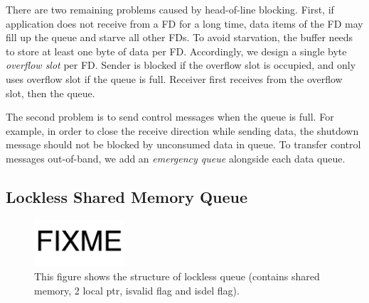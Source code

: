 There are two remaining problems caused by head-of-line blocking. First, if application does not receive from a FD for a long time, data items of the FD may fill up the queue and starve all other FDs. To avoid starvation, the buffer needs to store at least one byte of data per FD. Accordingly, we design a single byte \textit{overflow slot} per FD. Sender is blocked if the overflow slot is occupied, and only uses overflow slot if the queue is full. Receiver first receives from the overflow slot, then the queue.

The second problem is to send control messages when the queue is full. For example, in order to close the receive direction while sending data, the shutdown message should not be blocked by unconsumed data in queue. To transfer control messages out-of-band, we add an \textit{emergency queue} alongside each data queue.




\subsection{Lockless Shared Memory Queue}
\label{subsec:lockless-queue}

\begin{figure}[t]
	\centering
	\includegraphics[width=0.3\textwidth]{images/fixme}
	\caption{This figure shows the structure of lockless queue (contains shared memory, 2 local ptr, isvalid flag and isdel flag).}
	\label{fig:locklessq-structure}
\end{figure}

